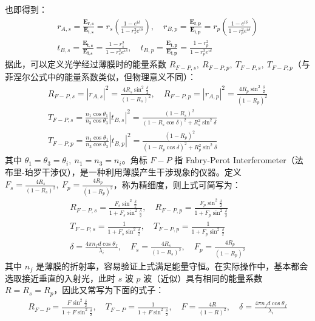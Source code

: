 \documentclass[UTF8]{report}
\theoremstyle{MyLineTheoremStyle} %
\theoremstyle{MyBlockTheoremStyle} %
\theoremstyle{MySubsubsectionStyle} %
\begin{document}
也即得到：
\begin{gather}
    r_{A,s}= \frac{\boldsymbol{E_{r,s}}}{\boldsymbol{E_{i,s}}} = r_s \left( \frac{1 - e^{i \delta}}{1 - r_s^2 e^{i \delta}} \right),\quad 
    r_{B,p} = \frac{\boldsymbol{E_{r,p}}}{\boldsymbol{E_{i,p}}} = r_p \left( \frac{1 - e^{i \delta}}{1 - r_p^2 e^{i \delta}} \right) \\
    t_{B,s} = \frac{\boldsymbol{E_{t,s}}}{\boldsymbol{E_{i,s}}} = \frac{1 - r_s^2}{1 - r_s^2 e^{i \delta}} ,\quad
    t_{B,p} = \frac{\boldsymbol{E_{t,p}}}{\boldsymbol{E_{i,p}}} = \frac{1 - r_p^2}{1 - r_p^2 e^{i \delta}}
\end{gather}
据此，可以定义光学经过薄膜时的能量系数 $R_{F-P,s},\ R_{F-P,p},\  T_{F-P,s},\  T_{F-P,p}$（与菲涅尔公式中的能量系数类似，但物理意义不同）：
\begin{gather}
    R_{F-P,s} = |r_{A,s}|^2 = \frac{4 R_s \sin^2 \frac{\delta}{2}}{(1 - R_s)^2}, \quad 
    R_{F-P,p} = |r_{A,p}|^2 = \frac{4 R_p \sin^2 \frac{\delta}{2}}{(1 - R_p)^2} \\ 
    T_{F-P,s}= \frac{n_1 \cos \theta_1}{n_3 \cos \theta_3} |t_{B,s}|^2 = \frac{(1 - R_s)^2}{ (1 - R_s\cos \delta)^2 + R_s^2 \sin^2 \delta} \\
    T_{F-P,p} = \frac{n_1 \cos \theta_1}{n_3 \cos \theta_3} |t_{B,p}|^2 = \frac{(1 - R_p)^2}{ (1 - R_p\cos \delta)^2 + R_p^2 \sin^2 \delta}
\end{gather}
其中 $\theta_1 = \theta_3 = \theta_i,\ n_1 = n_3 = n_i$。角标 $F-P$ 指 Fabry-Perot Interferometer（法布里-珀罗干涉仪），是一种利用薄膜产生干涉现象的仪器。定义 $F_s = \frac{4R_s}{(1 - R_s)^2},\ F_p = \frac{4R_p}{(1 - R_p)^2}$，称为精细度，则上式可简写为：
\begin{gather}
    R_{F-P, s} = \frac{F_s \sin^2 \frac{\delta}{2}}{1 + F_s \sin^2 \frac{\delta}{2}},\quad R_{F-P, p} = \frac{F_p \sin^2 \frac{\delta}{2}}{1 + F_p \sin^2 \frac{\delta}{2}} \\
    T_{F-P, s} = \frac{1}{1 + F_s \sin^2 \frac{\delta}{2}},\quad T_{F-P, p} = \frac{1}{1 + F_p \sin^2 \frac{\delta}{2}}\\ 
    \delta = \frac{4 \pi n_f d \cos \theta_f}{\lambda_i},\quad F_s = \frac{4R_s}{(1 - R_s)^2},\quad F_p = \frac{4R_p}{(1 - R_p)^2}
\end{gather}
其中 $n_f$ 是薄膜的折射率，容易验证上式满足能量守恒。在实际操作中，基本都会选取接近垂直的入射光，此时 $s$ 波 $p$ 波（近似）具有相同的能量系数 $R = R_s = R_p$，因此又常写为下面的式子：
\begin{gather}
    R_{F-P} = \frac{F \sin^2 \frac{\delta}{2}}{1 + F \sin^2 \frac{\delta}{2}},\quad T_{F-P} = \frac{1}{1 + F \sin^2 \frac{\delta}{2}},\quad F = \frac{4R}{(1 - R)^2},\quad \delta = \frac{4 \pi n_f d \cos \theta_f}{\lambda_i}
\end{gather}
\end{document}

